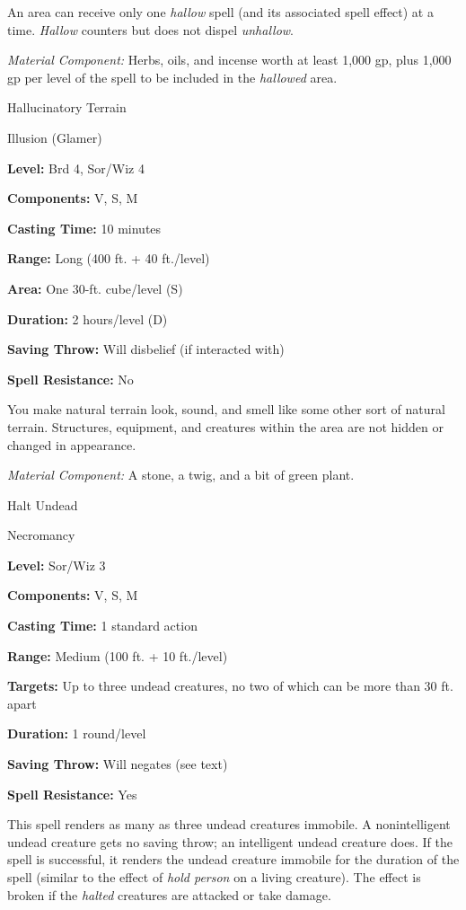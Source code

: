 \documentclass{article}
\begin{document}
An area can receive only one \textit{hallow }spell (and its associated spell effect) 
at a time. \textit{Hallow }counters but does not dispel \textit{unhallow}.

\textit{Material Component: }Herbs, oils, and incense worth at least 1,000 gp, 
plus 1,000 gp per level of the spell to be included in the \textit{hallowed }area.

\vspace{12pt}
Hallucinatory Terrain

Illusion (Glamer)

\textbf{Level:} Brd 4, Sor/Wiz 4

\textbf{Components:} V, S, M

\textbf{Casting Time:} 10 minutes

\textbf{Range:} Long (400 ft. + 40 ft./level)

\textbf{Area:} One 30-ft. cube/level (S)

\textbf{Duration:} 2 hours/level (D)

\textbf{Saving Throw: }Will disbelief (if interacted with)

\textbf{Spell Resistance:} No

You make natural terrain look, sound, and smell like some other sort of natural 
terrain. Structures, equipment, and creatures within the area are not hidden or 
changed in appearance.

\textit{Material Component: }A stone, a twig, and a bit of green plant.

\vspace{12pt}
Halt Undead

Necromancy

\textbf{Level:} Sor/Wiz 3

\textbf{Components:} V, S, M

\textbf{Casting Time:} 1 standard action

\textbf{Range: }Medium (100 ft. + 10 ft./level)

\textbf{Targets:} Up to three undead creatures, no two of which can be more than 
30 ft. apart

\textbf{Duration:} 1 round/level

\textbf{Saving Throw: }Will negates (see text)

\textbf{Spell Resistance:} Yes

This spell renders as many as three undead creatures immobile. A nonintelligent 
undead creature gets no saving throw; an intelligent undead creature does. If the 
spell is successful, it renders the undead creature immobile for the duration of 
the spell (similar to the effect of \textit{hold person }on a living creature). 
The effect is broken if the \textit{halted }creatures are attacked or take damage.
\end{document}
